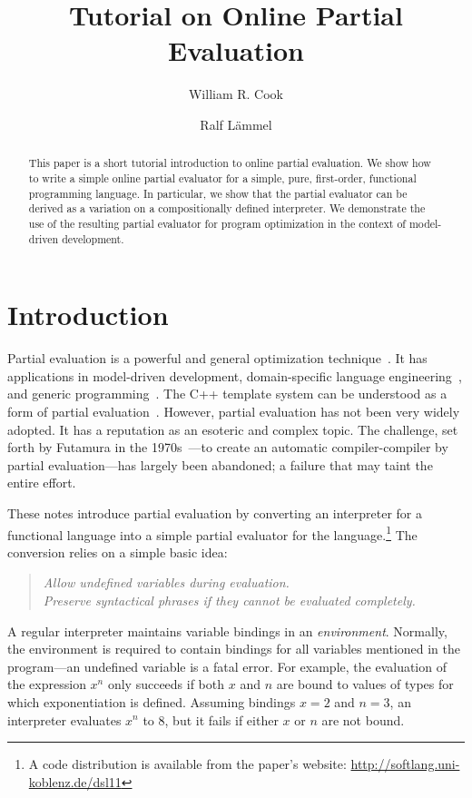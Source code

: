 \documentclass{eptcs}
\title{Tutorial on Online Partial Evaluation}
\author{William R. Cook
       \institute{Department of Computer Science, University of Texas
             at Austin, USA}
       \and Ralf L\"ammel 
       \institute{Department of Computer Science, University of
            Koblenz-Landau, Germany}
         }
\begin{document}
\maketitle

\begin{abstract}
  This paper is a short tutorial introduction to online partial
  evaluation. We show how to write a simple online partial evaluator
  for a simple, pure, first-order, functional programming language.
  In particular, we show that the partial evaluator can be derived as
  a variation on a compositionally defined interpreter. We demonstrate
  the use of the resulting partial evaluator for program optimization
  in the context of model-driven development.



\end{abstract}



\section{Introduction}

Partial evaluation is a powerful and general optimization technique~\cite{PartialEvalBookGomard}.
It has applications in model-driven development, domain-specific
language engineering~\cite{Hudak:1998:MDS:551789.853532}, 
and generic programming~\cite{Landauer:1999:GPP:874070.876061}.
The C++ template system can be understood as a form of partial
evaluation~\cite{Veldhuizen1998}. 
However, partial evaluation has not been very widely adopted.  It has
a reputation as an esoteric and complex topic. The challenge, set
forth by Futamura in the 1970s~\cite{Futamura+71}---to create an automatic
compiler-compiler by partial evaluation---has largely been abandoned; a
failure that may taint the entire effort.

These notes introduce partial evaluation by converting an interpreter
for a functional language into a simple partial evaluator for the
language.\footnote{A code distribution is available from the paper's
  website: \url{http://softlang.uni-koblenz.de/dsl11}} The conversion relies on a simple basic idea: 

\begin{quote}\itshape\centering
Allow undefined variables during evaluation.\\
Preserve syntactical phrases if they cannot be evaluated completely.
\end{quote}

\noindent
A regular interpreter maintains variable bindings in an
\textit{environment}.  Normally, the environment is required to
contain bindings for all variables mentioned in the program---an
undefined variable is a fatal error. For example, the evaluation of
the expression $x^n$ only succeeds if both $x$ and $n$ are bound to
values of types for which exponentiation is defined. Assuming bindings
$x=2$ and $n=3$, an interpreter evaluates $x^n$ to $8$, but it fails
if either $x$ or $n$ are not bound.
\end{document}

